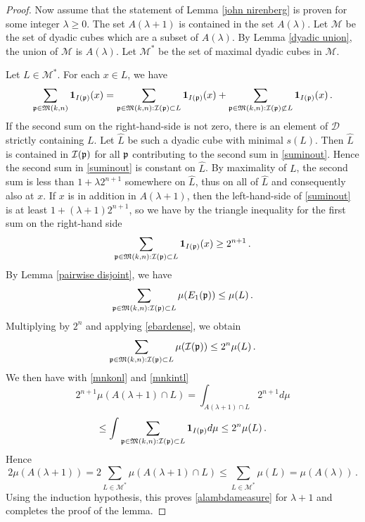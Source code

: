{\begin{proof}
Now assume that the statement of Lemma \ref{john nirenberg}
is proven for some integer $\lambda\ge 0$.
The set $A(\lambda+1)$ is contained in the set $A(\lambda)$.
Let  $\mathcal{M}$ be the set of dyadic cubes which are a subset of $A(\lambda)$. By Lemma \ref{dyadic union}, the union of $\mathcal{M}$ is $A(\lambda)$.
Let $\mathcal{M}^*$ be the set of maximal dyadic cubes in $\mathcal{M}$.

Let $L\in \mathcal{M}^*$. For each $x\in L$, we have
\begin{equation}\label{suminout}
 \sum_{\mathfrak p \in {\mathfrak{M}}(k,n)} \mathbf{1}_{I(\mathfrak p)}(x)=
   \sum_{\mathfrak p \in {\mathfrak{M}}(k,n):\mathcal{I}(\mathfrak p) \subset L} \mathbf{1}_{I(\mathfrak p)}(x)+
  \sum_{\mathfrak p \in {\mathfrak{M}}(k,n):\mathcal{I}(\mathfrak p) \not \subset L} \mathbf{1}_{I(\mathfrak p)}(x)\, .
\end{equation}
If the second sum on the right-hand-side is not zero, there is
an element of $\mathcal{D}$  strictly containing $L$.
Let $\hat{L}$ be such a dyadic cube with minimal $s(L)$. Then $\hat{L}$ is contained in $\mathcal{I}(\mathfrak p)$ for all $\mathfrak p$
contributing to the second sum in
\eqref{suminout}.
Hence the second sum in \eqref{suminout} is constant on
$\hat{L}$.
By maximality of $L$, the second sum is less than  $1+\lambda 2^{n+1}$ somewhere on $\hat{L}$, thus on all of $\hat{L}$ and consequently also
at $x$.
If $x$ is in addition in $A(\lambda+1)$, then
the left-hand-side of \eqref{suminout} is at least
$1+(\lambda+1) 2^{n+1}$, so we have by the triangle inequality for the first sum on the right-hand side
\begin{equation}\label{mnkonl}
\sum_{\mathfrak p \in {\mathfrak{M}}(k,n):\mathcal{I}(\mathfrak p) \subset L} \mathbf{1}_{I(\mathfrak p)}(x)\ge 2^{n+1}\, .\end{equation}
By Lemma \ref{pairwise disjoint}, we have
\begin{equation}
\sum_{\mathfrak p \in {\mathfrak{M}}(k,n):\mathcal{I}(\mathfrak p) \subset L} \mu({E_1}(\mathfrak p)) \leq \mu(L)\, .
\end{equation}
Multiplying by $2^n$ and applying  \eqref{ebardense}, we obtain
\begin{equation}\label{mnkintl}
    \sum_{\mathfrak p \in {\mathfrak{M}}(k,n):\mathcal{I}(\mathfrak p) \subset L} \mu(\mathcal{I}(\mathfrak p))  \leq 2^n \mu(L)\, .
\end{equation}
We then have with \eqref{mnkonl} and \eqref{mnkintl}
\begin{equation}
2^{n+1}\mu(A(\lambda+1)\cap L) =
 \int_{A(\lambda+1)\cap L} 2^{n+1} d\mu
\end{equation}
\begin{equation}
\le
    \int \sum_{\mathfrak p \in {\mathfrak{M}}(k,n):\mathcal{I}(\mathfrak p) \subset L} \mathbf{1}_{I(\mathfrak p)} d\mu
\le 2^n \mu(L)\, .
\end{equation}
Hence
\begin{equation}
    2\mu(A(\lambda+1))=2\sum_{L\in \mathcal{M}^*}
\mu(A(\lambda+1)\cap L)\le
\sum_{L\in \mathcal{M}^*}\mu( L)= \mu(A(\lambda))\, .
\end{equation}
Using the induction hypothesis, this proves
\eqref{alambdameasure} for $\lambda+1$ and completes the proof of the lemma.
\end{proof}

}
